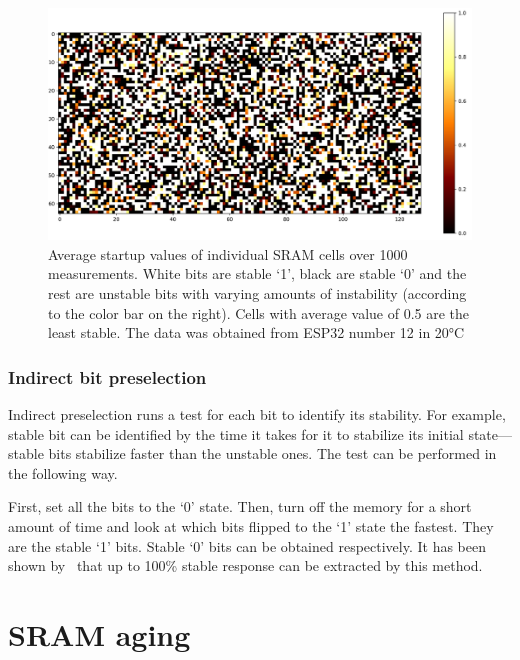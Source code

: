 \begin{figure}[ht!]
    \centering
    \captionsetup{justification=justified,margin=0.5cm}
    \includegraphics[width=\textwidth]{images/bit_stability.png}
    \caption[Average startup values of individual SRAM cells over 1000 measurements.]{Average startup values of individual SRAM cells over 1000 measurements. White bits are stable `1', black are stable `0' and the rest are unstable bits with varying amounts of instability (according to the color bar on the right). Cells with average value of 0.5 are the least stable. The data was obtained from ESP32 number 12 in 20°C}
    \label{fig:bit_stability_mask}
\end{figure}

\subsubsection*{Indirect bit preselection}

Indirect preselection runs a test for each bit to identify its stability. For example, stable bit can be identified by the time it takes for it to stabilize its initial state---stable bits stabilize faster than the unstable ones. The test can be performed in the following way.

First, set all the bits to the `0' state. Then, turn off the memory for a short amount of time and look at which bits flipped to the `1' state the fastest. They are the stable `1' bits. Stable `0' bits can be obtained respectively. It has been shown by~\cite{Liu2017} that up to 100\% stable response can be extracted by this method.

\section{SRAM aging}

